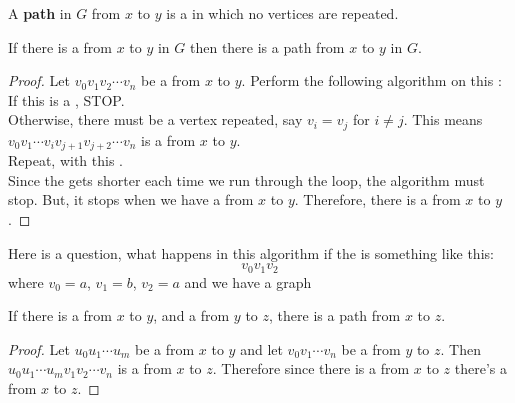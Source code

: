 \documentclass[english, 11pt]{article}
\begin{document}
\begin{defn}[path]\label{path}
A \textbf{path} in $G$ from $x$ to $y$ is a  in which no vertices are repeated.
\end{defn}

\begin{thrm}
  If there is a  from $x$ to $y$ in $G$ then there is a path from $x$ to $y$ in $G$.
\end{thrm}

\begin{proof}
  Let $v_0v_1v_2\cdots v_n$ be a  from $x$ to $y$. Perform the following algorithm on this : \\
  If this is a , STOP. \\
  Otherwise, there must be a vertex repeated, say $v_i = v_j$ for $i \not = j$. This means $v_0v_1\cdots v_iv_{j+1}v_{j+2}\cdots v_n$ is a  from $x$ to $y$. \\
  Repeat, with this . \\
  Since the  gets shorter each time we run through the loop, the algorithm must stop. But, it stops when we have a  from $x$ to $y$. Therefore, there is a  from $x$ to $y$.
\end{proof}

Here is a question, what happens in this algorithm if the  is something like this:
\[ v_0v_1v_2 \]
where $v_0 = a$, $v_1 = b$, $v_2 = a$ and we have a graph
\begin{center}
\end{center}
\begin{cor}
  If there is a  from $x$ to $y$, and a  from $y$ to $z$, there is a path from $x$ to $z$.
\end{cor}

\begin{proof}
  Let $u_0u_1\cdots u_m$ be a  from $x$ to $y$ and let $v_0 v_1 \cdots v_n$ be a  from $y$ to $z$. Then $u_0u_1\cdots u_m v_1 v_2 \cdots v_n$ is a  from $x$ to $z$. Therefore since there is a  from $x$ to $z$ there's a  from $x$ to $z$.
\end{proof}
\end{document}
